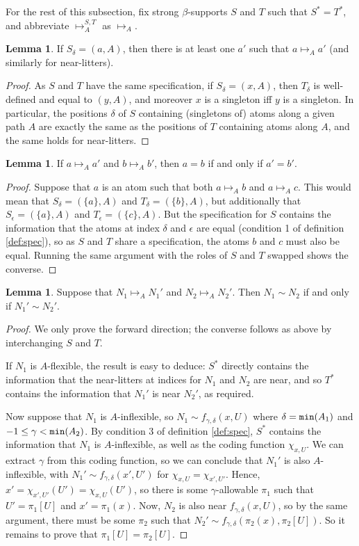 \documentclass{article}
\theoremstyle{definition}
\newtheorem{lemma}[theorem]{Lemma}
\theoremstyle{remark}
\begin{document}
{For the rest of this subsection, fix strong $\beta$-supports $S$ and $T$ such that $S^* = T^*$, and abbreviate $\mapsto^{S,T}_A$ as $\mapsto_A$.

\begin{lemma}
  If $S_\delta = (a, A)$, then there is at least one $a'$ such that $a \mapsto_A a'$ (and similarly for near-litters).
\end{lemma}
\begin{proof}
  As $S$ and $T$ have the same specification, if $S_\delta = (x, A)$, then $T_\delta$ is well-defined and equal to $(y, A)$, and moreover $x$ is a singleton iff $y$ is a singleton.
  In particular, the positions $\delta$ of $S$ containing (singletons of) atoms along a given path $A$ are exactly the same as the positions of $T$ containing atoms along $A$, and the same holds for near-litters.
\end{proof}
\begin{lemma}
  If $a \mapsto_A a'$ and $b \mapsto_A b'$, then $a = b$ if and only if $a' = b'$.
\end{lemma}
\begin{proof}
  Suppose that $a$ is an atom such that both $a \mapsto_A b$ and $a \mapsto_A c$.
  This would mean that $S_\delta = (\{a\}, A)$ and $T_\delta = (\{b\}, A)$, but additionally that $S_\epsilon = (\{a\}, A)$ and $T_\epsilon = (\{c\}, A)$.
  But the specification for $S$ contains the information that the atoms at index $\delta$ and $\epsilon$ are equal (condition 1 of definition \ref{def:spec}), so as $S$ and $T$ share a specification, the atoms $b$ and $c$ must also be equal.
  Running the same argument with the roles of $S$ and $T$ swapped shows the converse.
\end{proof}
\begin{lemma}\label{lem:sim_mapsto_sim}
  Suppose that $N_1 \mapsto_A N_1'$ and $N_2 \mapsto_A N_2'$.
  Then $N_1 \sim N_2$ if and only if $N_1' \sim N_2'$.
\end{lemma}
\begin{proof}
  We only prove the forward direction; the converse follows as above by interchanging $S$ and $T$.

  If $N_1$ is $A$-flexible, the result is easy to deduce: $S^*$ directly contains the information that the near-litters at indices for $N_1$ and $N_2$ are near, and so $T^*$ contains the information that $N_1'$ is near $N_2'$, as required.

  Now suppose that $N_1$ is $A$-inflexible, so $N_1 \sim f_{\gamma,\delta}(x,U)$ where $\delta = {\tt min}(A_1)$ and $-1 \leq \gamma < {\tt min}(A_2)$.
  By condition 3 of definition \ref{def:spec}, $S^*$ contains the information that $N_1$ is $A$-inflexible, as well as the coding function $\chi_{x,U}$.
  We can extract $\gamma$ from this coding function, so we can conclude that $N_1'$ is also $A$-inflexible, with $N_1' \sim f_{\gamma,\delta}(x',U')$ for $\chi_{x,U} = \chi_{x',U'}$.
  Hence, $x' = \chi_{x',U'}(U') = \chi_{x,U}(U')$, so there is some $\gamma$-allowable $\pi_1$ such that $U' = \pi_1[U]$ and $x' = \pi_1(x)$.
  Now, $N_2$ is also near $f_{\gamma,\delta}(x,U)$, so by the same argument, there must be some $\pi_2$ such that $N_2' \sim f_{\gamma,\delta}(\pi_2(x), \pi_2[U])$.
  So it remains to prove that $\pi_1[U] = \pi_2[U]$.


\end{proof}}
\end{document}
